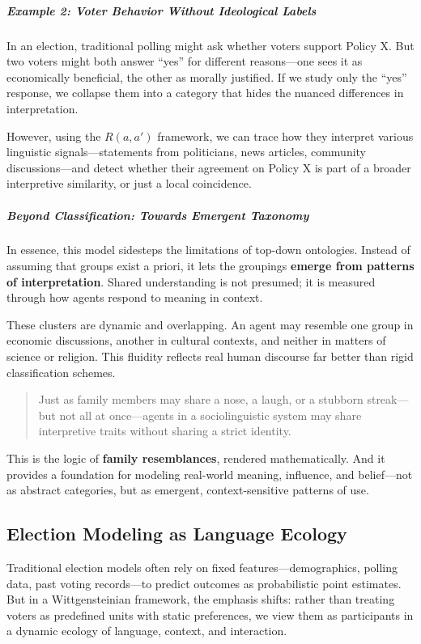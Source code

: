 \subparagraph{Example 2: Voter Behavior Without Ideological Labels}

In an election, traditional polling might ask whether voters support Policy X. But two voters might both answer “yes” for different reasons—one sees it as economically beneficial, the other as morally justified. If we study only the “yes” response, we collapse them into a category that hides the nuanced differences in interpretation.

However, using the \( R(a, a') \) framework, we can trace how they interpret various linguistic signals—statements from politicians, news articles, community discussions—and detect whether their agreement on Policy X is part of a broader interpretive similarity, or just a local coincidence.

\subparagraph{Beyond Classification: Towards Emergent Taxonomy}

In essence, this model sidesteps the limitations of top-down ontologies. Instead of assuming that groups exist a priori, it lets the groupings \textbf{emerge from patterns of interpretation}. Shared understanding is not presumed; it is measured through how agents respond to meaning in context.

These clusters are dynamic and overlapping. An agent may resemble one group in economic discussions, another in cultural contexts, and neither in matters of science or religion. This fluidity reflects real human discourse far better than rigid classification schemes.

\begin{quote}
Just as family members may share a nose, a laugh, or a stubborn streak—but not all at once—agents in a sociolinguistic system may share interpretive traits without sharing a strict identity.
\end{quote}

This is the logic of \textbf{family resemblances}, rendered mathematically. And it provides a foundation for modeling real-world meaning, influence, and belief—not as abstract categories, but as emergent, context-sensitive patterns of use.



\subsection{Election Modeling as Language Ecology}

Traditional election models often rely on fixed features—demographics, polling data, past voting records—to predict outcomes as probabilistic point estimates. But in a Wittgensteinian framework, the emphasis shifts: rather than treating voters as predefined units with static preferences, we view them as participants in a dynamic ecology of language, context, and interaction.

